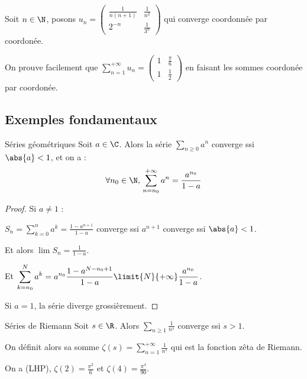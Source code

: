 \begin{exemple}
    Soit $n \in \N$, posons $u_n = 
    \begin{pmatrix}
        \frac 1 {n(n+1)} & \frac 1 {n^2}\\
        2^{-n} & \frac 1 {3^n}
    \end{pmatrix}
    $ qui converge coordonnée par coordonée.

    On prouve facilement que $\sum_{n=1}^{+ \infty} u_n =
    \begin{pmatrix}
        1 & \frac {\pi} 6\\
        1 & \frac 1 2
    \end{pmatrix}$ en faisant les sommes coordonée par coordonée.
\end{exemple}

\subsection{Exemples fondamentaux}

\begin{theoreme}{Séries géométriques}{}
    Soit $a \in \C$. Alors la série $\sum_{n \geqslant 0} a^n$ converge ssi $\abs{a} < 1$, 
    et on a : \[\forall n_0 \in \N, \, \sum_{n = n_0}^{+ \infty} a^n = \frac{a^{n_0}}{1 - a}\]
\end{theoreme}


\begin{proof}
    Si $a \neq 1$ : 

    $\displaystyle S_n = \sum_{k = 0}^{n } a^k = \frac{1 - a^{n+1}}{1 - a}$ converge ssi 
    $a^{n+1} $ converge ssi $\abs{a} < 1$.

    Et alors $\lim S_n = \frac{1}{1 - a}$.

    Et $\displaystyle \sum_{k = n_0 }^{N} a^k = a^{n_0} \frac{1 - a^{N - n_0 + 1}}{1 - a} \limit{N}{+ \infty} \frac{a^{n_0}}{1 - a}$.

    Si $a = 1$, la série diverge grossièrement.
\end{proof}

\begin{theoreme}{Séries de Riemann}{}
    Soit $s \in \R$. Alors $\displaystyle \sum_{n \geqslant 1} \frac{1}{n^s}$ converge ssi $s > 1$.

    On définit alors sa somme $\displaystyle \zeta(s) = \sum_{n = 1}^{+\infty} \frac{1}{n^s}$ qui est la fonction zêta de Riemann.
    
    On a (LHP), $\zeta(2) = \frac{\pi^2}{6}$ et $\zeta(4) = \frac{\pi^4}{90}$.
\end{theoreme}

